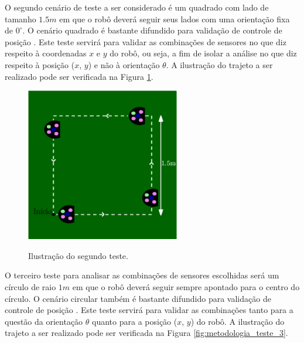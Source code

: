 \documentclass[acronym, symbols, table]{fei}
\begin{document}
		O segundo cenário de teste a ser considerado é um quadrado com lado de tamanho $1.5m$ em que o robô deverá seguir seus lados com uma orientação fixa de $0^\circ$. O cenário quadrado é bastante difundido para validação de controle de posição \cites{rostami2018localization}{gonccalves2008real}{santini1997trajectory}. Este teste servirá para validar as combinações de sensores no que diz respeito à coordenadas $x$ e $y$ do robô, ou seja, a fim de isolar a análise no que diz respeito à posição ($x$, $y$) e não à orientação $\theta$. A ilustração do trajeto a ser realizado pode ser verificada na Figura \ref{fig:metodologia_teste_2}.
		
		\begin{figure}[!htb]
			\centering
			\caption{Ilustração do segundo teste.}
			\includegraphics[width=0.6\textwidth]{teste_2.eps}
			\label{fig:metodologia_teste_2}
		\end{figure}
		
		O terceiro teste para analisar as combinações de sensores escolhidas será um círculo de raio $1m$ em que o robô deverá seguir sempre apontado para o centro do círculo. O cenário circular também é bastante difundido para validação de controle de posição \cites{suliman2009mobile}{marton2013two}{rigatos2010extended}{eman2020mobile}. Este teste servirá para validar as combinações tanto para a questão da orientação $\theta$ quanto para a posição ($x$, $y$) do robô. A ilustração do trajeto a ser realizado pode ser verificada na Figura \ref{fig:metodologia_teste_3}.
		
\end{document}
